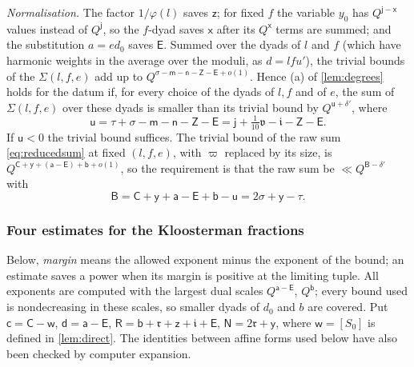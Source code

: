 \documentclass[11pt,colorlinks]{charlie}
\begin{document}
\emph{Normalisation.} The factor $1/\varphi(l)$ saves $\mathsf z$; for fixed $f$ the variable $y_0$ has $Q^{\mathsf j-\mathsf x}$ values instead of $Q^{\mathsf j}$, so the $f$-dyad saves $\mathsf x$ after its $Q^{\mathsf x}$ terms are summed; and the substitution $a=ed_0$ saves $\mathsf E$. Summed over the dyads of $l$ and $f$ (which have harmonic weights in the average over the moduli, as $d=lfu'$), the trivial bounds of the $\Sigma(l,f,e)$ add up to $Q^{\sigma-\mathsf m-\mathsf n-\mathsf Z-\mathsf E+o(1)}$. Hence (a) of \cref{lem:degrees} holds for the datum if, for every choice of the dyads of $l,f$ and of $e$, the sum of $\Sigma(l,f,e)$ over these dyads is smaller than its trivial bound by $Q^{\mathsf u+\delta'}$, where
\[
 \mathsf u=\tau+\sigma-\mathsf m-\mathsf n-\mathsf Z-\mathsf E=\mathsf j+\tfrac1{10}\mathfrak v-\mathfrak i-\mathsf Z-\mathsf E .
\]
If $\mathsf u<0$ the trivial bound suffices. The trivial bound of the raw sum \eqref{eq:reducedsum} at fixed $(l,f,e)$, with $\varpi$ replaced by its size, is $Q^{\mathsf C+\mathsf y+(\mathsf a-\mathsf E)+\mathsf b+o(1)}$, so the requirement is that the raw sum be $\ll Q^{\mathsf B-\delta'}$ with
\[
 \mathsf B=\mathsf C+\mathsf y+\mathsf a-\mathsf E+\mathsf b-\mathsf u=2\sigma+\mathsf y-\tau .
\]

\subsubsection*{Four estimates for the Kloosterman fractions}

Below, \emph{margin} means the allowed exponent minus the exponent of the bound; an estimate saves a power when its margin is positive at the limiting tuple. All exponents are computed with the largest dual scales $Q^{\mathsf a-\mathsf E}$, $Q^{\mathsf b}$; every bound used is nondecreasing in these scales, so smaller dyads of $d_0$ and $b$ are covered. Put $\mathsf c=\mathsf C-\mathsf w$, $\mathsf d=\mathsf a-\mathsf E$, $\mathsf R=\mathsf b+\mathfrak r+\mathsf z+\mathfrak i+\mathsf E$, $\mathsf N=2\mathfrak r+\mathsf y$, where $\mathsf w=[S_0]$ is defined in \cref{lem:direct}. The identities between affine forms used below have also been checked by computer expansion.
\end{document}
